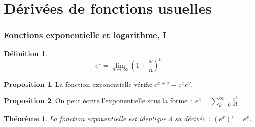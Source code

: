 \documentclass[10pt,notheorems]{beamer}
\theoremstyle{plain}
\newtheorem{theorem}{Théorème}
\theoremstyle{definition} %
\newtheorem{definition}{Définition}
\newtheorem{prop}{Proposition}
\begin{document}
\section{Dérivées de fonctions usuelles}

\begin{frame}
  \frametitle{Fonctions exponentielle et logarithme, I}
  \hypertarget{slide_derivee_exp_log_1}{}

  \begin{definition}\label{def:exponentielle-comme-une-limite}
    \[
      e^x = \lim_{n\to\infty}\left( 1+\frac{x}{n} \right)^n
    \]
  \end{definition}

  \begin{prop}\label{prop:exponentielle-somme-produit}
    La fonction exponentielle vérifie $e^{x+y}=e^xe^y$.
  \end{prop}

  \begin{prop}\label{prop:exponentielle-série-entière}
    On peut écrire l'exponentielle sous la forme~: $e^x = \sum_{k=0}^{\infty}\frac{x^k}{k!}$
  \end{prop}

  \begin{theorem}\label{thm:exponentielle-dérivée}
    La fonction exponentielle est identique à sa dérivée~: $\left(e^x\right)'=e^x$.
  \end{theorem}

\end{frame}
\end{document}
